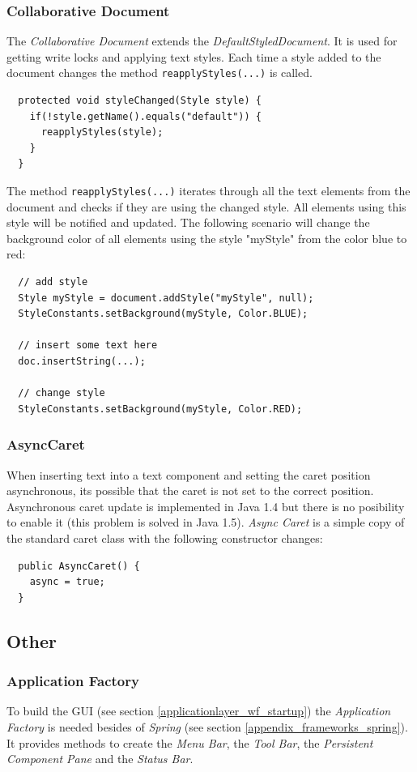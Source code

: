 \subsubsection{Collaborative Document}
\label{applicationlayer_collabdocument}
The \textit{Collaborative Document} extends the \textit{DefaultStyledDocument}. It is used for getting write locks and applying text styles. Each time a style added to the document changes the method \texttt{reapplyStyles(...)} is called.
\begin{verbatim}
  protected void styleChanged(Style style) {
    if(!style.getName().equals("default")) {
      reapplyStyles(style);
    }
  }
\end{verbatim}

The method \texttt{reapplyStyles(...)} iterates through all the text elements from the document and checks if they are using the changed style. All elements using this style will be notified and updated. The following scenario will change the background color of all elements using the style "myStyle" from the color blue to red:
\begin{verbatim}
  // add style
  Style myStyle = document.addStyle("myStyle", null);
  StyleConstants.setBackground(myStyle, Color.BLUE);
  
  // insert some text here
  doc.insertString(...);
  
  // change style
  StyleConstants.setBackground(myStyle, Color.RED);
\end{verbatim}

\subsubsection{AsyncCaret}
When inserting text into a text component and setting the caret position asynchronous, its possible that the caret is not set to the correct position. Asynchronous caret update is implemented in Java 1.4 but there is no posibility to enable it (this problem is solved in Java 1.5). \textit{Async Caret} is a simple copy of the standard caret class with the following constructor changes:
\begin{verbatim}
  public AsyncCaret() {
    async = true;
  }
\end{verbatim}

\subsection{Other}
\subsubsection{Application Factory}
\label{applicationlayer_applicationfactory}
To build the GUI (see section \ref{applicationlayer_wf_startup}) the \textit{Application Factory} is needed besides of \textit{Spring} (see section \ref{appendix_frameworks_spring}). It provides methods to create the \textit{Menu Bar}, the \textit{Tool Bar}, the \textit{Persistent Component Pane} and the \textit{Status Bar}.

